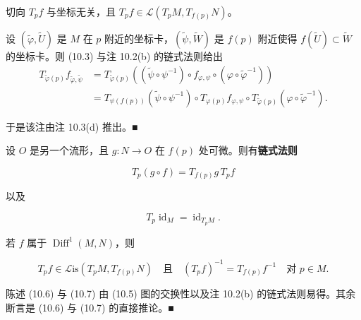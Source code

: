 \begin{remark}

\begin{items}
\item

切向 $ T_{p}f $ 与坐标无关，且 $ T_{p}f \in \mathcal{L}(T_{p}M, T_{f(p)}N) $。

\proofhead
设 $ (\tilde{\varphi},\tilde{U}) $ 是 $ M $ 在 $ p $ 附近的坐标卡，$ (\tilde{\psi},\tilde{W}) $ 是 $ f(p) $ 附近使得 $ f(\tilde{U}) \subset \tilde{W} $ 的坐标卡。则 (10.3) 与注 10.2(b) 的链式法则给出
\begin{equation*}
\begin{aligned}
T_{\tilde{\varphi}(p)}f_{\tilde{\varphi},\tilde{\psi}} &= T_{\tilde{\varphi}(p)}\left((\tilde{\psi}\circ\psi^{-1})\circ f_{\varphi,\psi}\circ(\varphi\circ\tilde{\varphi}^{-1})\right) \\ &= T_{\psi(f(p))}(\tilde{\psi}\circ\psi^{-1})\circ T_{\varphi(p)}f_{\varphi,\psi}\circ T_{\tilde{\varphi}(p)}(\varphi\circ\tilde{\varphi}^{-1}) .
\end{aligned}
\end{equation*}

于是该注由注 10.3(d) 推出。\nobreak\hspace{0.35em}■

\item

设 $ O $ 是另一个流形，且 $ g : N \to O $ 在 $ f(p) $ 处可微。则有\textbf{链式法则}

\begin{equation}
T_{p}(g\circ f) = T_{f(p)}g\,T_{p}f\tag{10.6}
\end{equation}

以及

\begin{equation}
T_{p}\operatorname{id}_{M} = \operatorname{id}_{T_{p}M} .\tag{10.7}
\end{equation}

若 $ f $ 属于 $ \operatorname{Diff}^{1}(M,N) $，则

\[
T_{p}f \in \mathcal{L}\mathrm{is}(T_{p}M, T_{f(p)}N) \quad \text{且} \quad (T_{p}f)^{-1} = T_{f(p)}f^{-1} \quad \text{对 } p \in M .
\]

\proofhead
陈述 (10.6) 与 (10.7) 由 (10.5) 图的交换性以及注 10.2(b) 的链式法则易得。其余断言是 (10.6) 与 (10.7) 的直接推论。\nobreak\hspace{0.35em}■
\end{items}

\end{remark}


